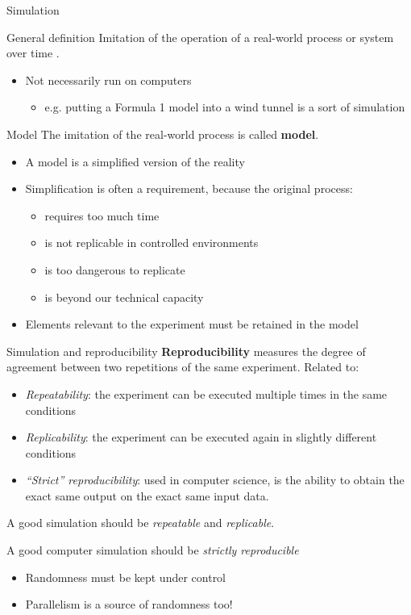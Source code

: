 \documentclass[presentation]{beamer}
\begin{document}
\begin{frame}{Simulation}
	\begin{block}{General definition}
		Imitation of the operation of a real-world process or system over time \cite{des-book}.
		\begin{itemize}
			\item Not necessarily run on computers
			\begin{itemize}
				\item e.g. putting a Formula 1 model into a wind tunnel is a sort of simulation
			\end{itemize}
		\end{itemize}
	\end{block}
	\begin{block}{Model}
		The imitation of the real-world process is called \textbf{model}.
		\begin{itemize}
			\item A model is a simplified version of the reality
			\item Simplification is often a requirement, because the original process:
			\begin{itemize}
				\item requires too much time
				\item is not replicable in controlled environments
				\item is too dangerous to replicate
				\item is beyond our technical capacity
			\end{itemize}
			\item Elements relevant to the experiment must be retained in the model
		\end{itemize}
	\end{block}
\end{frame}

\begin{frame}{Simulation and reproducibility}
    \textbf{Reproducibility} measures the degree of agreement between two repetitions of the same experiment.
    Related to:
    \begin{itemize}
        \item \textit{Repeatability}: the experiment can be executed multiple times in the same conditions
        \item \textit{Replicability}: the experiment can be executed again in slightly different conditions
        \item \textit{``Strict'' reproducibility}: used in computer science, is the ability to obtain the exact same output
        on the exact same input data.
    \end{itemize}

    A good simulation should be \textit{repeatable} and \textit{replicable}.

    A good computer simulation should be \textit{strictly reproducible}
    \begin{itemize}
        \item Randomness must be kept under control
        \item Parallelism is a source of randomness too!
    \end{itemize}
\end{frame}
\end{document}
